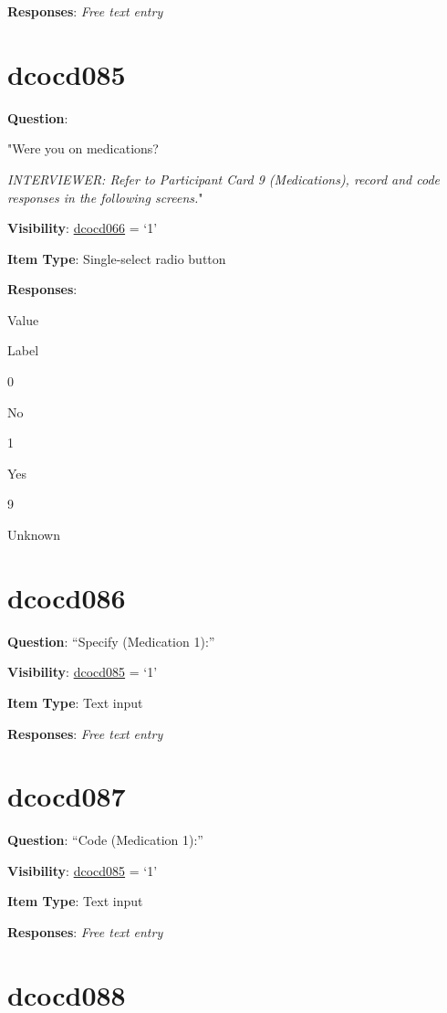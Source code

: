 \documentclass[]{book}
\begin{document}
\textbf{Responses}: \emph{Free text entry}

\hypertarget{dcocd085}{%
\section{dcocd085}\label{dcocd085}}

\textbf{Question}:

"Were you on medications?

\emph{INTERVIEWER: Refer to Participant Card 9 (Medications), record and code responses in the following screens.}"

\textbf{Visibility}: \protect\hyperlink{dcocd066}{dcocd066} = `1'

\textbf{Item Type}: Single-select radio button

\textbf{Responses}:

Value

Label

0

No

1

Yes

9

Unknown

\hypertarget{dcocd086}{%
\section{dcocd086}\label{dcocd086}}

\textbf{Question}: ``Specify (Medication 1):''

\textbf{Visibility}: \protect\hyperlink{dcocd085}{dcocd085} = `1'

\textbf{Item Type}: Text input

\textbf{Responses}: \emph{Free text entry}

\hypertarget{dcocd087}{%
\section{dcocd087}\label{dcocd087}}

\textbf{Question}: ``Code (Medication 1):''

\textbf{Visibility}: \protect\hyperlink{dcocd085}{dcocd085} = `1'

\textbf{Item Type}: Text input

\textbf{Responses}: \emph{Free text entry}

\hypertarget{dcocd088}{%
\section{dcocd088}\label{dcocd088}}
\end{document}
